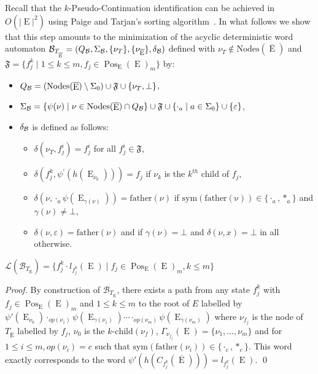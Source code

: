 \documentclass{llncs}
\def\Po#1#2{\Pos_{#1}{(#2)}}
\DeclareMathOperator{\E}{E}
\DeclareMathOperator{\Pos}{Pos}
\def\b#1{\overline{#1}}
\begin{document}
Recall that the $k$-Pseudo-Continuation identification can be achieved in $O(|\E|^2)$ \cite{ZPC2,automate2} using Paige and Tarjan's sorting algorithm~\cite{tarjan}. In what follows we show that this step amounts to the minimization of the acyclic deterministic word automaton ${\cal B}_{T_{_{\b\E}}} =(Q_{\cal B},\Sigma_{\cal B},\{\nu_T\},\{\nu_{\b\E}\},\delta_{\cal B})$ defined  with $\nu_T\notin\mathrm{Nodes}(\b\E)$ and $\mathfrak{F}=\{f^k_j \mid 1\leq k \leq m, f_j\in \Po{\E}{\E}_m\}$ by: 
\begin{itemize}
\item $Q_{\cal B}=(\mathrm{Nodes}(\b\E)\setminus\Sigma_0)\cup \mathfrak{F} \cup\{\nu_T,\bot\}$,
\item $\Sigma_{\cal B}=\{\psi(\nu)\mid \nu\in\mathrm{Nodes}(\b\E)\cap Q_{\cal B}\}\cup\mathfrak{F} \cup\{\cdot_a\mid a\in\Sigma_0\}\cup\{\varepsilon\}$,
\item $\delta_{\cal B}$ is defined as follows:
	\begin{itemize}
	\item $\delta(\nu_T,f^i_j)=f^i_j$ for all  $f^i_j\in \mathfrak{F}$,
	\item $\delta(f^k_j,\psi^\prime(h(\E_{\nu_k})))=f_j$ if $\nu_k$ is the $k^{th}$ child of $f_j$,
	\item $\delta(\nu,\cdot_a\psi(\E_{\gamma(\nu)}))=\mathrm{father}(\nu)$ if $\mathrm{sym(father(\nu))}\in\{\cdot_a,*_a\}$ and $\gamma(\nu)\neq\bot$,
	\item $\delta(\nu,\varepsilon)=\mathrm{father}(\nu)$ and if $\gamma(\nu)=\bot$ and $\delta(\nu,x)=\bot$ in all otherwise.  
	 \end{itemize}
\end{itemize}     

\begin{proposition}\label{prop lang B-T-E}
$\mathcal{L}(\mathcal{B}_{T_{\overline{\E}}})=\{f_j^k \cdot l_{f^k_j}(\E)\mid f_j\in\Po{\E}{\E}_m, k\leq m \}$
\end{proposition}
\begin{proof}
  By construction of $\mathcal{B}_{T_{\overline{\E}}}$, there exists a path from any state $f_j^k$ with $f_j\in\Po{\E}{\E}_m$ and $1\leq k\leq m$ to the root of $E$ labelled by $ \psi'(\E_{\nu_0}) \cdot_{op(\nu_1)} \psi(\E_{\gamma(\nu_1)})\cdots \cdot_{op(\nu_{m})} \psi( \E_{\gamma(\nu_m)})$ where $\nu_{f_j}$ is the node of $T_{\b\E}$ labelled by $f_j$, $\nu_0$ is the $k\mbox{-}\mathrm{child}(\nu_{f})$, $\Gamma_{\nu_{f_j}}(\E)=\{\nu_1, \dots,\nu_m \}$ and for $1\leq i\leq m,op(\nu_i)=c$ such that $\mathrm{sym}(\mathrm{father}(\nu_i)) \in \{\cdot_c,{*_c}\}$. This word exactly corresponds to the word $\psi'(h(C_{f^k_j}(\b\E)))=l_{f^k_j}(\E)$.
 \qed
\end{proof} 
\end{document}

